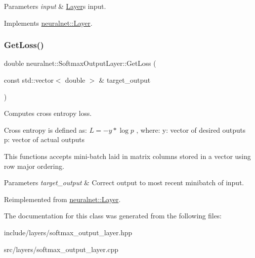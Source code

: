 \begin{DoxyParams}{Parameters}
{\em input} & \hyperlink{classneuralnet_1_1Layer}{Layer}\textquotesingle{}s input. \\
\hline
\end{DoxyParams}


Implements \hyperlink{classneuralnet_1_1Layer_abd0fdf1146eb28485349337e68ad7982}{neuralnet\+::\+Layer}.

\mbox{\label{classneuralnet_1_1SoftmaxOutputLayer_a6cc46c109780dca4700f622b2a378aa8}} 
\subsubsection{\texorpdfstring{Get\+Loss()}{GetLoss()}}
{\footnotesize\ttfamily double neuralnet\+::\+Softmax\+Output\+Layer\+::\+Get\+Loss (\begin{DoxyParamCaption}\item[{const std\+::vector$<$ double $>$ \&}]{target\+\_\+output }\end{DoxyParamCaption})\hspace{0.3cm}{\ttfamily [virtual]}}



Computes cross entropy loss. 

Cross entropy is defined as\+: $L = -y * \log{p} $ , where\+: y\+: vector of desired outputs p\+: vector of actual outputs

This functions accepts mini-\/batch laid in matrix columns stored in a vector using row major ordering.


\begin{DoxyParams}{Parameters}
{\em target\+\_\+output} & Correct output to most recent minibatch of input. \\
\hline
\end{DoxyParams}


Reimplemented from \hyperlink{classneuralnet_1_1Layer_a2da35925d900e217848443a07791b575}{neuralnet\+::\+Layer}.



The documentation for this class was generated from the following files\+:\begin{DoxyCompactItemize}
\item 
include/layers/softmax\+\_\+output\+\_\+layer.\+hpp\item 
src/layers/softmax\+\_\+output\+\_\+layer.\+cpp\end{DoxyCompactItemize}

